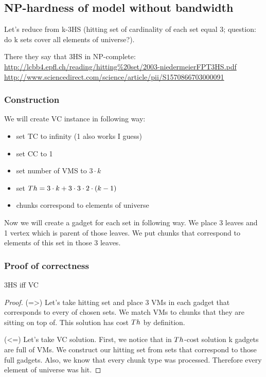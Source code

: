 
\subsection{NP-hardness of model without bandwidth}
Let's reduce from k-3HS (hitting set of cardinality of each set equal
3; question: do k sets cover all elements of universe?).

There they say that 3HS in NP-complete:
\url{http://lcbb4.epfl.ch/reading/hitting\%20set/2003-niedermeierFPT3HS.pdf}
\url{http://www.sciencedirect.com/science/article/pii/S1570866703000091}


\subsubsection{Construction}

We will create VC instance in following way:
\begin{itemize}
\item set TC to infinity (1 also works I guess)
\item set CC to 1
\item set number of VMS to $3 \cdot k$
\item set $Th =  3 \cdot k + 3 \cdot 3 \cdot 2 \cdot (k - 1)$
\item chunks correspond to elements of universe
\end{itemize}

Now we will create a gadget for each set in following way. We place 3
leaves and 1 vertex which is parent of those leaves. We put chunks
that correspond to elements of this set in those 3 leaves.

\subsubsection{Proof of correctness}
\begin{theorem}
3HS iff VC
\end{theorem}
\begin{proof}

(=>) Let's take hitting set and place 3 VMs in each gadget that
corresponds to every of chosen sets. We match VMs to chunks that they
are sitting on top of. This solution has cost $Th$ by definition.

(<=) Let's take VC solution. First, we notice that in $Th$-cost
solution k gadgets are full of VMs. We construct our hitting set from
sets that correspond to those full gadgets. Also, we know that every
chunk type was processed. Therefore every element of universe was hit.
\end{proof}

